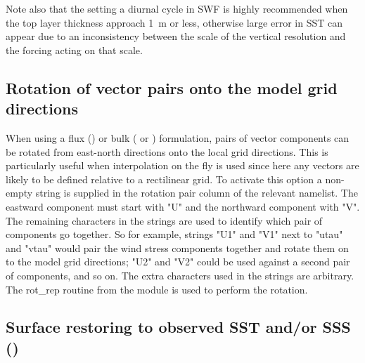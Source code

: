 \documentclass[../tex_main/NEMO_manual]{subfiles}
\begin{document}
Note also that the setting a diurnal cycle in SWF is highly recommended when
the top layer thickness approach 1~m or less, otherwise large error in SST can appear due to
an inconsistency between the scale of the vertical resolution and the forcing acting on that scale.

\subsection{Rotation of vector pairs onto the model grid directions}
\label{subsec:SBC_rotation}

When using a flux () or
bulk ( or ) formulation,
pairs of vector components can be rotated from east-north directions onto the local grid directions.
This is particularly useful when interpolation on the fly is used since here any vectors are likely to
be defined relative to a rectilinear grid.
To activate this option a non-empty string is supplied in the rotation pair column of the relevant namelist.
The eastward component must start with "U" and the northward component with "V".  
The remaining characters in the strings are used to identify which pair of components go together.
So for example, strings "U1" and "V1" next to "utau" and "vtau" would pair the wind stress components together and
rotate them on to the model grid directions;
"U2" and "V2" could be used against a second pair of components, and so on.
The extra characters used in the strings are arbitrary.
The rot\_rep routine from the  module is used to perform the rotation.

\subsection{Surface restoring to observed SST and/or SSS (\protect{})}
\label{subsec:SBC_ssr}
\end{document}
